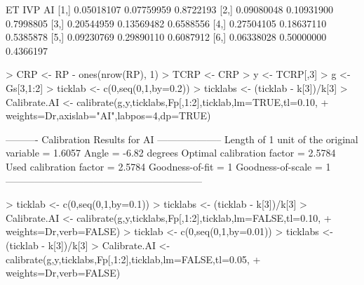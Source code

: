 \documentclass[a4paper]{article}
\begin{document}
\begin{Schunk}
\begin{Soutput}
             ET        IVP        AI
[1,] 0.05018107 0.07759959 0.8722193
[2,] 0.09080048 0.10931900 0.7998805
[3,] 0.20544959 0.13569482 0.6588556
[4,] 0.27504105 0.18637110 0.5385878
[5,] 0.09230769 0.29890110 0.6087912
[6,] 0.06338028 0.50000000 0.4366197
\end{Soutput}
\begin{Sinput}
> CRP <- RP - ones(nrow(RP), 1) %
> TCRP <- CRP%
> y <- TCRP[,3]
> g <- Gs[3,1:2]
> ticklab  <- c(0,seq(0,1,by=0.2))                         
> ticklabs <- (ticklab - k[3])/k[3]
> Calibrate.AI <- calibrate(g,y,ticklabs,Fp[,1:2],ticklab,lm=TRUE,tl=0.10,
+                           weights=Dr,axislab="AI",labpos=4,dp=TRUE)
\end{Sinput}
\begin{Soutput}
---------- Calibration Results for  AI  --------------------
Length of 1 unit of the original variable =  1.6057  
Angle                                     =  -6.82 degrees
Optimal calibration factor                =  2.5784  
Used calibration factor                   =  2.5784  
Goodness-of-fit                           =  1  
Goodness-of-scale                         =  1  
------------------------------------------------------------
\end{Soutput}
\begin{Sinput}
> ticklab  <- c(0,seq(0,1,by=0.1))                         
> ticklabs <- (ticklab - k[3])/k[3]
> Calibrate.AI <- calibrate(g,y,ticklabs,Fp[,1:2],ticklab,lm=FALSE,tl=0.10,
+                           weights=Dr,verb=FALSE)
> ticklab  <- c(0,seq(0,1,by=0.01))                         
> ticklabs <- (ticklab - k[3])/k[3]
> Calibrate.AI <- calibrate(g,y,ticklabs,Fp[,1:2],ticklab,lm=FALSE,tl=0.05,
+                           weights=Dr,verb=FALSE)
\end{Sinput}
\end{Schunk}
\end{document}
